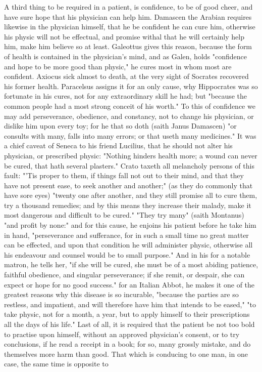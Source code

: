 {A third thing to be required in a patient, is confidence, to be of good cheer, and have sure hope that his physician can help him. Damascen the Arabian requires likewise in the physician himself, that he be confident he can cure him, otherwise his physic will not be effectual, and promise withal that he will certainly help him, make him believe so at least. Galeottus gives this reason, because the form of health is contained in the physician's mind, and as Galen, holds "confidence and hope to be more good than physic," he cures most in whom most are confident. Axiocus sick almost to death, at the very sight of Socrates recovered his former health. Paracelsus assigns it for an only cause, why Hippocrates was so fortunate in his cures, not for any extraordinary skill he had; but "because the common people had a most strong conceit of his worth." To this of confidence we may add perseverance, obedience, and constancy, not to change his physician, or dislike him upon every toy; for he that so doth (saith Janus Damascen) "or consults with many, falls into many errors; or that useth many medicines." It was a chief caveat of Seneca to his friend Lucilius, that he should not alter his physician, or prescribed physic: "Nothing hinders health more; a wound can never be cured, that hath several plasters." Crato  taxeth all melancholy persons of this fault: "'Tis proper to them, if things fall not out to their mind, and that they have not present ease, to seek another and another;" (as they do commonly that have sore eyes) "twenty one after another, and they still promise all to cure them, try a thousand remedies; and by this means they increase their malady, make it most dangerous and difficult to be cured." "They try many" (saith Montanus) "and profit by none:" and for this cause,  he enjoins his patient before he take him in hand, "perseverance and sufferance, for in such a small time no great matter can be effected, and upon that condition he will administer physic, otherwise all his endeavour and counsel would be to small purpose." And in his  for a notable matron, he tells her, "if she will be cured, she must be of a most abiding patience, faithful obedience, and singular perseverance; if she remit, or despair, she can expect or hope for no good success."  for an Italian Abbot, he makes it one of the greatest reasons why this disease is so incurable, "because the parties are so restless, and impatient, and will therefore have him that intends to be eased," "to take physic, not for a month, a year, but to apply himself to their prescriptions all the days of his life." Last of all, it is required that the patient be not too bold to practise upon himself, without an approved physician's consent, or to try conclusions, if he read a receipt in a book; for so, many grossly mistake, and do themselves more harm than good. That which is conducing to one man, in one case, the same time is opposite to }
